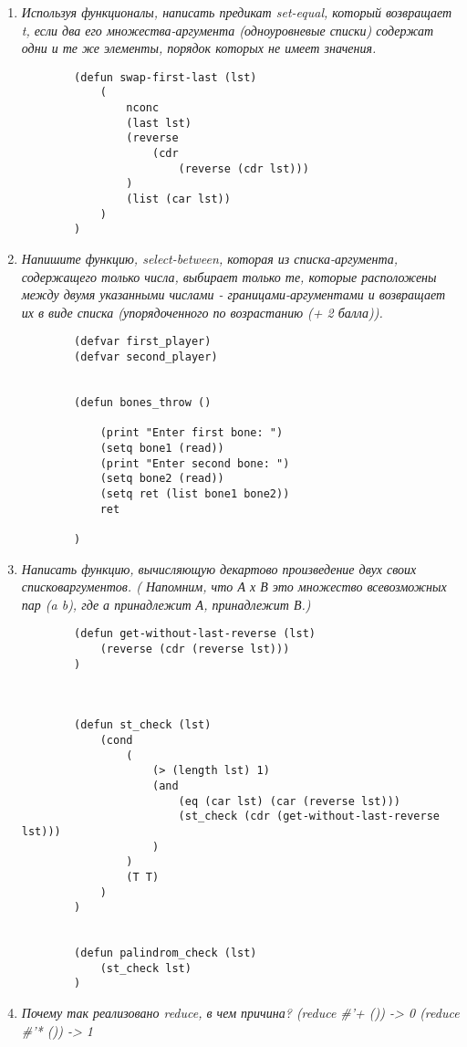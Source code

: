 \begin{enumerate}[wide=0pt]
	\begin{lstlisting}
		(defun get-last (lst)
			(
				nbutlast lst 1
			)
		)
	\end{lstlisting}


	\item  \textit{Используя функционалы, написать предикат set-equal, который возвращает t, если два
	его множества-аргумента (одноуровневые списки) содержат одни и те же элементы,
	порядок которых не имеет значения.}
	
	\begin{lstlisting}
		(defun swap-first-last (lst)
			(
				nconc 
				(last lst)
				(reverse 
					(cdr 
						(reverse (cdr lst)))
				)
				(list (car lst))
			)
		)
	\end{lstlisting}

	\item  \textit{Напишите функцию, select-between, которая из списка-аргумента, содержащего только
	числа, выбирает только те, которые расположены между двумя указанными числами -
	границами-аргументами и возвращает их в виде списка (упорядоченного по
	возрастанию (+ 2 балла)).}

	\begin{lstlisting}
		(defvar first_player)
		(defvar second_player)
		
		
		(defun bones_throw ()
		
			(print "Enter first bone: ")
			(setq bone1 (read))
			(print "Enter second bone: ")
			(setq bone2 (read))
			(setq ret (list bone1 bone2))
			ret
		
		)

	\end{lstlisting}

	\item  \textit{Написать функцию, вычисляющую декартово произведение двух своих списковаргументов. ( Напомним, что А х В это множество всевозможных пар (a b), где а
	принадлежит А, принадлежит В.)}
	\begin{lstlisting}
		(defun get-without-last-reverse (lst)
			(reverse (cdr (reverse lst)))
		)



		(defun st_check (lst)
			(cond
				(
					(> (length lst) 1)
					(and
						(eq (car lst) (car (reverse lst)))
						(st_check (cdr (get-without-last-reverse lst)))
					)
				)
				(T T)
			)
		)


		(defun palindrom_check (lst)
			(st_check lst)
		)
	\end{lstlisting}

	\item  \textit{Почему так реализовано reduce, в чем причина?
	(reduce \#'+ ()) -> 0 (reduce \#'* ()) -> 1}
	

\end{enumerate}
